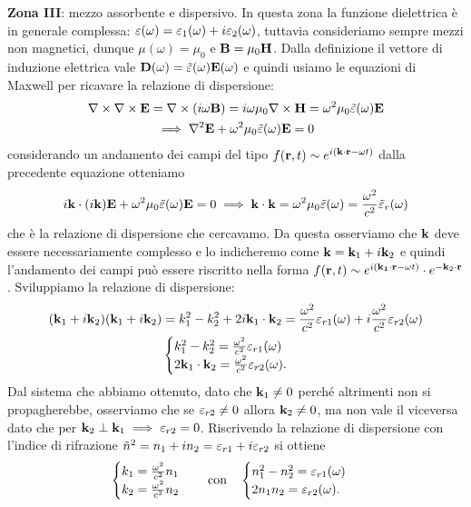 \textbf{Zona III}: mezzo assorbente e dispersivo. In questa zona la funzione dielettrica è in generale complessa: 
$ \varepsilon(\omega) = \varepsilon_1(\omega) + i \varepsilon_2(\omega) $, tuttavia consideriamo sempre mezzi non magnetici, dunque 
$ \mu(\omega) = \mu_0 $ e $ \mathbf{B} = \mu_0 \mathbf{H} $. Dalla definizione il vettore di induzione elettrica vale 
$ \mathbf{D}(\omega) = \tilde{\varepsilon}(\omega) \mathbf{E}(\omega) $ e quindi usiamo le equazioni di Maxwell per ricavare la relazione di dispersione:
\begin{gather}
  \nabla \times \nabla \times \mathbf{E} = \nabla \times \left( i\omega \mathbf{B} \right) = i\omega \mu_0 \nabla \times \mathbf{H} 
  = \omega^2 \mu_0 \tilde{\varepsilon}(\omega) \mathbf{E}
  \\
  \implies \nabla^2 \mathbf{E} + \omega^2 \mu_0 \tilde{\varepsilon}(\omega) \mathbf{E} = 0
\end{gather}
considerando un andamento dei campi del tipo $ f(\mathbf{r},t) \sim e^{i(\mathbf{k \cdot r} - \omega t)}$ dalla precedente equazione otteniamo
\begin{align}
  i \mathbf{k} \cdot (i \mathbf{k}) \mathbf{E} + \omega^2 \mu_0 \tilde{\varepsilon}(\omega) \mathbf{E} = 0 \implies \mathbf{k \cdot k} = \omega^2 \mu_0 \tilde{\varepsilon}(\omega) 
  = \frac{\omega^2}{c^2} \tilde{\varepsilon}_r(\omega)
\end{align}
che è la relazione di dispersione che cercavamo. Da questa osserviamo che $ \mathbf{k} $ deve essere necessariamente complesso e lo indicheremo come
$ \mathbf{k} = \mathbf{k}_1 + i\mathbf{k}_2 $ e quindi l'andamento dei campi può essere riscritto nella forma 
$ f(\mathbf{r},t) \sim e^{i(\mathbf{k_1 \cdot r} - \omega t)}\cdot e^{-\mathbf{k}_2 \cdot \mathbf{r}} $. Sviluppiamo la relazione di dispersione:
\begin{align}
  (\mathbf{k}_1 + i\mathbf{k}_2)(\mathbf{k}_1 + i\mathbf{k}_2) &= k_1^2 -k_2^2 + 2 i\mathbf{k}_1  \cdot \mathbf{k}_2 
  = \frac{\omega^2}{c^2} \varepsilon_{r1}(\omega) + i \frac{\omega^2}{c^2} \varepsilon_{r2}(\omega)
  \\
  &\begin{cases}
    k_1^2 -k_2^2 = \frac{\omega^2}{c^2} \varepsilon_{r1}(\omega)
    \\
    2\mathbf{k}_1  \cdot \mathbf{k}_2 = \frac{\omega^2}{c^2} \varepsilon_{r2}(\omega).
  \end{cases}
\end{align}
Dal sistema che abbiamo ottenuto, dato che $ \mathbf{k}_1 \neq 0 $ perché altrimenti non si propagherebbe, osserviamo che se $ \varepsilon_{r2} \neq 0 $ allora 
$ \mathbf{k}_2 \neq 0 $, ma non vale il viceversa dato che per $ \mathbf{k}_2 \perp \mathbf{k}_1 \implies \varepsilon_{r2} = 0 $. Riscrivendo la relazione di dispersione con 
l'indice di rifrazione $ \tilde{n}^2 = n_1 + in_2 = \varepsilon_{r1} + i \varepsilon_{r2} $ si ottiene
\begin{align}
  \begin{cases}
    k_1 = \frac{\omega^2}{c^2} n_1
    \\
    k_2 = \frac{\omega^2}{c^2} n_2
  \end{cases}
  \quad \textnormal{con} \quad 
  \begin{cases}
    n_1^2 -n_2^2 = \varepsilon_{r1}(\omega)
    \\
    2n_1 n_2 = \varepsilon_{r2}(\omega).
  \end{cases}
\end{align}

